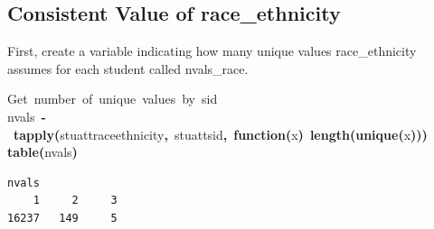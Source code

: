 \documentclass[12pt]{article}
\makeatletter
\newcommand{\hlfunctioncall}[1]{\textcolor[rgb]{0.501960784313725,0,0.329411764705882}{\textbf{#1}}}%
\newcommand{\hlkeyword}[1]{\textcolor[rgb]{0,0,0}{\textbf{#1}}}%
\newcommand{\hlcomment}[1]{\textcolor[rgb]{0.180392156862745,0.6,0.341176470588235}{#1}}%
\newcommand{\hlformalargs}[1]{\textcolor[rgb]{0.690196078431373,0.250980392156863,0.0196078431372549}{#1}}%
\newcommand{\hlassignement}[1]{\textcolor[rgb]{0,0,0}{\textbf{#1}}}%
\newcommand{\hlsymbol}[1]{\textcolor[rgb]{0,0,0}{#1}}%
\newcommand{\hlstd}[1]{\textcolor[rgb]{0,0,0}{#1}}%
\newenvironment{kframe}{%
 \def\FrameCommand##1{\hskip\@totalleftmargin \hskip-\fboxsep
 \colorbox{shadecolor}{##1}\hskip-\fboxsep
     \hskip-\linewidth \hskip-\@totalleftmargin \hskip\columnwidth}%
 \MakeFramed {\advance\hsize-\width
   \@totalleftmargin\z@ \linewidth\hsize
   \@setminipage}}%
 {\par\unskip\endMakeFramed}
\newenvironment{knitrout}{}{} %
\makeatother
\begin{document}
\subsection{Consistent Value of race\_ethnicity}

First, create a variable indicating how many unique values race\_ethnicity assumes for each student called nvals\_race.




\begin{knitrout}
\color{fgcolor}\begin{kframe}
\begin{flushleft}
\ttfamily\noindent
\hlcomment{\usebox{\hlnormalsizeboxhash}{\ }Get{\ }number{\ }of{\ }unique{\ }values{\ }by{\ }sid}\hspace*{\fill}\\
\hlstd{}\hlsymbol{nvals}{\ }\hlassignement{\usebox{\hlnormalsizeboxlessthan}-}{\ }\hlfunctioncall{tapply}\hlkeyword{(}\hlsymbol{stuatt}\hlkeyword{\usebox{\hlnormalsizeboxdollar}}\hlsymbol{race\usebox{\hlnormalsizeboxunderscore}ethnicity}\hlkeyword{,}{\ }\hlsymbol{stuatt}\hlkeyword{\usebox{\hlnormalsizeboxdollar}}\hlsymbol{sid}\hlkeyword{,}{\ }\hlkeyword{function}\hlkeyword{(}\hlformalargs{x}\hlkeyword{)}{\ }\hlfunctioncall{length}\hlkeyword{(}\hlfunctioncall{unique}\hlkeyword{(}\hlsymbol{x}\hlkeyword{)}\hlkeyword{)}\hlkeyword{)}\hspace*{\fill}\\
\hlstd{}\hlfunctioncall{table}\hlkeyword{(}\hlsymbol{nvals}\hlkeyword{)}\mbox{}
\normalfont
\end{flushleft}
\begin{verbatim}
nvals
    1     2     3 
16237   149     5 
\end{verbatim}
\end{kframe}
\end{knitrout}
\end{document}
